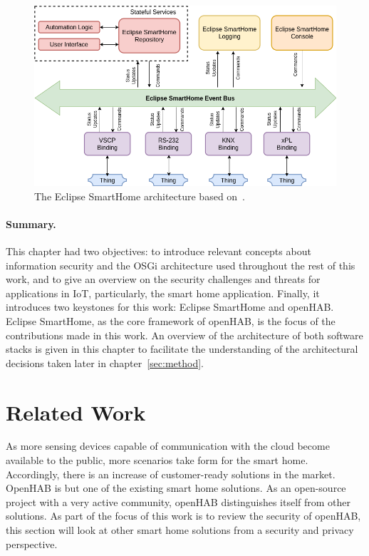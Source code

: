 \documentclass[12pt]{article}
\begin{document}
\begin{figure} [ht] 
\begin{center}
\includegraphics[width=\textwidth]{esh_architecture}
\caption{The Eclipse SmartHome architecture based on~\cite{esh_02}.}
\label{fig:esh_architecture}
\end{center}
\end{figure}

\paragraph{Summary.} This chapter had two objectives: to introduce relevant concepts about information security and the OSGi architecture used throughout the rest of this work, and to give an overview on the security challenges and threats for applications in IoT, particularly, the smart home application. Finally, it introduces two keystones for this work: Eclipse SmartHome and openHAB. Eclipse SmartHome, as the core framework of openHAB, is the focus of the contributions made in this work. An overview of the architecture of both software stacks is given in this chapter to facilitate the understanding of the architectural decisions taken later in chapter~\ref{sec:method}.

\clearpage
\section{Related Work}
\label{sec:related}
As more sensing devices capable of communication with the cloud become available to the public, more scenarios take form for the smart home. Accordingly, there is an increase of customer-ready solutions in the market. OpenHAB is but one of the existing smart home solutions. As an open-source project with a very active community, openHAB distinguishes itself from other solutions. As part of the focus of this work is to review the security of openHAB, this section will look at other smart home solutions from a security and privacy perspective. 
\end{document}
